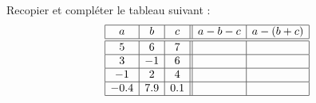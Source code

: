 
\begin{exercice}\label{exosmath-0758}

Recopier et compléter le tableau suivant :
\begin{equation*}
    \begin{array}[]{|c|c|c||c|c|}
        \hline
        a&b&c&a-b-c&a-(b+c)\\
        \hline\hline
        5&6&7&&\\
        \hline
        3&-1&6&&\\
        \hline
        -1&2&4&&\\
        \hline
        -0.4&7.9&0.1&&\\
        \hline
    \end{array}
\end{equation*}

\end{exercice}
